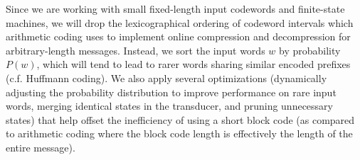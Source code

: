 \documentclass[english]{article}
\begin{document}
Since we are working with small fixed-length input codewords and finite-state machines, we will drop the lexicographical ordering of codeword intervals
which arithmetic coding uses to implement online compression and decompression for arbitrary-length messages.
Instead, we sort the input words $w$ by probability $P(w)$, which will tend to lead to rarer words sharing similar encoded prefixes
(c.f. Huffmann coding).
We also apply several optimizations (dynamically adjusting the probability distribution to improve performance on rare input words,
merging identical states in the transducer, and pruning unnecessary states) that help offset the inefficiency of using a short block code
(as compared to arithmetic coding where the block code length is effectively the length of the entire message).

\begin{algorithm}


\end{algorithm}
\end{document}
